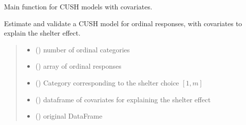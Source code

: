 \documentclass[letterpaper,10pt,english]{sphinxmanual}
\begin{document}

\begin{fulllineitems}
\label{\detokenize{cubmods:cubmods.cush_x.mle}}
\pysigstartsignatures
{}
\pysigstopsignatures
\sphinxAtStartPar
Main function for CUSH models with covariates.

\sphinxAtStartPar
Estimate and validate a CUSH model for ordinal responses, with covariates
to explain the shelter effect.
\begin{quote}\begin{description}
\begin{itemize}
\item {} 
\sphinxAtStartPar
{} () \textendash{} number of ordinal categories

\item {} 
\sphinxAtStartPar
{} () \textendash{} array of ordinal responses

\item {} 
\sphinxAtStartPar
{} () \textendash{} Category corresponding to the shelter choice \([1,m]\)

\item {} 
\sphinxAtStartPar
{} () \textendash{} dataframe of covariates for explaining the shelter effect

\item {} 
\sphinxAtStartPar
{} () \textendash{} original DataFrame


\end{itemize}
\end{description}
\end{quote}
\end{fulllineitems}
\end{document}
